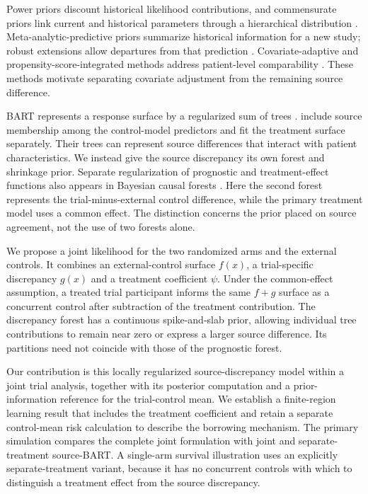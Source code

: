\documentclass[11pt]{article}
\begin{document}
Power priors discount historical likelihood contributions, and commensurate priors link current and historical parameters through a hierarchical distribution \citep{IbrahimChen2000,Hobbs2011,Hobbs2012}. Meta-analytic-predictive priors summarize historical information for a new study; robust extensions allow departures from that prediction \citep{Neuenschwander2010MAP,Schmidli2014MAP}. Covariate-adaptive and propensity-score-integrated methods address patient-level comparability \citep{Jin2023CAHB,Chen2020PSCL}. These methods motivate separating covariate adjustment from the remaining source difference.

BART represents a response surface by a regularized sum of trees \citep{Chipman2010BART}. \citet{ZhouJi2021} include source membership among the control-model predictors and fit the treatment surface separately. Their trees can represent source differences that interact with patient characteristics. We instead give the source discrepancy its own forest and shrinkage prior. Separate regularization of prognostic and treatment-effect functions also appears in Bayesian causal forests \citep{Hahn2020BCF}. Here the second forest represents the trial-minus-external control difference, while the primary treatment model uses a common effect. The distinction concerns the prior placed on source agreement, not the use of two forests alone.

We propose a joint likelihood for the two randomized arms and the external controls. It combines an external-control surface $f(x)$, a trial-specific discrepancy $g(x)$ and a treatment coefficient $\psi$. Under the common-effect assumption, a treated trial participant informs the same $f+g$ surface as a concurrent control after subtraction of the treatment contribution. The discrepancy forest has a continuous spike-and-slab prior, allowing individual tree contributions to remain near zero or express a larger source difference. Its partitions need not coincide with those of the prognostic forest.

Our contribution is this locally regularized source-discrepancy model within a joint trial analysis, together with its posterior computation and a prior-information reference for the trial-control mean. We establish a finite-region learning result that includes the treatment coefficient and retain a separate control-mean risk calculation to describe the borrowing mechanism. The primary simulation compares the complete joint formulation with joint and separate-treatment source-BART. A single-arm survival illustration uses an explicitly separate-treatment variant, because it has no concurrent controls with which to distinguish a treatment effect from the source discrepancy.
\end{document}

